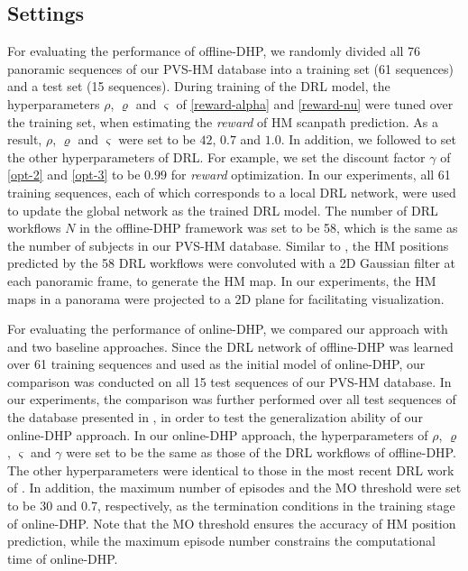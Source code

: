 \documentclass[10pt,journal,compsoc]{IEEEtran}
\begin{document}
\subsection{Settings}\label{sec:settings}
For evaluating the performance of offline-DHP, we randomly divided all 76 panoramic sequences of our PVS-HM database into a training set (61 sequences) and a test set (15 sequences). During training of the DRL model, the hyperparameters $\rho$, $\varrho$ and $\varsigma$ of \eqref{reward-alpha} and \eqref{reward-nu} were tuned over the training set,  when estimating the \textit{reward} of HM scanpath prediction. As a result, $\rho$, $\varrho$ and $\varsigma$ were set to be $42$, $0.7$ and $1.0$. In addition, we followed \cite{mnih2016asynchronous} to set the other hyperparameters of DRL. For example, we set the discount factor $\gamma$ of \eqref{opt-2} and \eqref{opt-3} to be $0.99$ for \textit{reward} optimization. In our experiments, all 61 training sequences, each of which corresponds to a local DRL network, were used to update the global network as the trained DRL model.
The number of DRL workflows $N$ in the offline-DHP framework was set to be 58, which is the same as the number of subjects in our PVS-HM database.
Similar to \cite{matin1974saccadic},  the HM positions predicted by the 58 DRL workflows were convoluted with a 2D Gaussian filter at each panoramic frame, to generate the HM map.
In our experiments, the HM maps in a panorama were projected to a 2D plane for facilitating visualization.

For evaluating the performance of online-DHP, we compared our approach with \cite{hu2017deep} and two baseline approaches. Since the DRL network of offline-DHP was learned over 61 training sequences and used as the initial model of online-DHP, our comparison was conducted on all 15 test sequences of our PVS-HM database. In our experiments, the comparison was further performed over all test sequences of the database presented in \cite{hu2017deep}, in order to test the generalization ability of our online-DHP approach.
In our online-DHP approach, the hyperparameters of $\rho$, $\varrho$, $\varsigma$ and $\gamma$ were set to be the same as those of the DRL workflows of offline-DHP.
The other hyperparameters were identical to those in the most recent DRL work of \cite{mnih2016asynchronous}.
In addition, the maximum number of episodes and the MO threshold were set to be 30 and 0.7, respectively, as the termination conditions in the training stage of online-DHP. Note that the MO threshold ensures the accuracy of HM position prediction, while the maximum episode number constrains the computational time of online-DHP.
\end{document}
